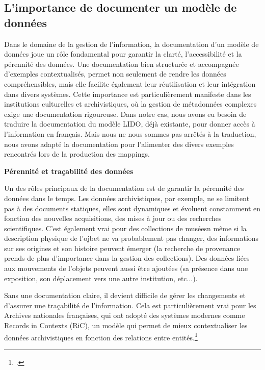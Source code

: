 \subsection{L’importance de documenter un modèle de données}

Dans le domaine de la gestion de l'information, la documentation d’un modèle de données joue un rôle fondamental pour garantir la clarté, l'accessibilité et la pérennité des données. Une documentation bien structurée et accompagnée d'exemples contextualisés, permet non seulement de rendre les données compréhensibles, mais elle facilite également leur réutilisation et leur intégration dans divers systèmes. Cette importance est particulièrement manifeste dans les institutions culturelles et archivistiques, où la gestion de métadonnées complexes exige une documentation rigoureuse. Dans notre cas, nous avons eu besoin de traduire la documentation du modèle LIDO, déjà existante, pour donner accès à l’information en français. Mais nous ne nous sommes pas arrêtés à la traduction, nous avons adapté la documentation pour l’alimenter des divers exemples rencontrés lors de la production des mappings. \newline

\textbf{Pérennité et traçabilité des données}\newline

Un des rôles principaux de la documentation est de garantir la pérennité des données dans le temps. Les données archivistiques, par exemple, ne se limitent pas à des documents statiques, elles sont dynamiques et évoluent constamment en fonction des nouvelles acquisitions, des mises à jour ou des recherches scientifiques. C'est également vrai pour des collections de muséesn même si la description physique de l'ojbet ne va probablement pas changer, des informations sur ses origines et son histoire peuvent émerger (la recherche de provenance prends de plus d'importance dans la gestion des collections). Des données liées aux mouvements de l'objets peuvent aussi être ajoutées (sa présence dans une exposition, son déplacement vers une autre institution, etc...). \newline

Sans une documentation claire, il devient difficile de gérer les changements et d'assurer une traçabilité de l'information. Cela est particulièrement vrai pour les Archives nationales françaises, qui ont adopté des systèmes modernes comme Records in Contexts (RiC), un modèle qui permet de mieux contextualiser les données archivistiques en fonction des relations entre entités.\footcite{clavaud} \newline

